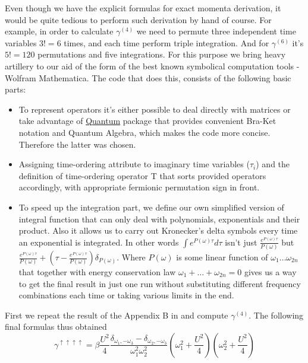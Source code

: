Even though we have the explicit formulas for exact momenta derivation, it would be quite tedious to perform such derivation by hand of course.
For example, in order to calculate $\gamma^{(4)}$ we need to permute three independent time variables  $3!=6$ times, and each time perform triple integration.
And for $\gamma^{(6)}$ it's $5!=120$ permutations and five integrations.
For this purpose we bring heavy artillery to our aid of the form of the best known symbolical computation tools - Wolfram Mathematica.
The code that does this, consists of the following basic parts:
\begin{itemize}
 \item To represent operators it's either possible to deal directly with matrices or take advantage of \href{http://homepage.cem.itesm.mx/lgomez/quantum/}{Quantum}
package that provides convenient Bra-Ket notation and Quantum Algebra, which makes the code more concise. Therefore the latter was chosen.
 \item Assigning time-ordering attribute to imaginary time variables ($\tau_i$) and the definition of time-ordering operator T that sorts provided operators accordingly,
with appropriate fermionic permutation sign in front.
 \item To speed up the integration part, we define our own simplified version of integral function that can only deal with polynomials, exponentials and their product.
Also it allows us to carry out Kronecker's delta symbols every time an exponential is integrated.
In other words $\int e^{P(\omega)\tau}d\tau$ isn't just $\frac{e^{P(\omega)\tau}}{P(\omega)}$
 but $\frac{e^{P(\omega)\tau}}{P(\omega)}+(\tau-\frac{e^{P(\omega)\tau}}{P(\omega)})\delta_{P(\omega)}$.
Where $P(\omega)$ is some linear function of $\omega_1\dots\omega_{2n}$ that together with energy conservation law $\omega_1+\dots+\omega_{2n}=0$ 
 gives us a way to get the final result in just one run without substituting different frequency combinations each time or taking various limits in the end.
\end{itemize}

First we repeat the result of the Appendix B in \cite{0809.1051} and compute $\gamma^{(4)}$. The following final formulas thus obtained
\begin{equation} 
 \label{gamma4}
 \gamma^{\uparrow\uparrow\uparrow\uparrow} = \beta \frac{U^2}{4}\frac{\delta_{\omega_1,-\omega_3}-\delta_{\omega_2,-\omega_3}}{\omega_1^2\omega_2^2}
  (\omega_1^2+\frac{U^2}{4})(\omega_2^2+\frac{U^2}{4}) 
\end{equation}

